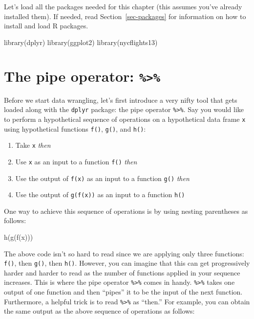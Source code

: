 \documentclass[
  letterpaper,
  DIV=11,
  numbers=noendperiod]{scrreprt}
\newenvironment{Shaded}{\begin{snugshade}}{\end{snugshade}}
\newcommand{\FunctionTok}[1]{\textcolor[rgb]{0.28,0.35,0.67}{#1}}
\newcommand{\NormalTok}[1]{\textcolor[rgb]{0.00,0.23,0.31}{#1}}
\providecommand{\tightlist}{%
  \setlength{\itemsep}{0pt}\setlength{\parskip}{0pt}}\usepackage{longtable,booktabs,array}
\theoremstyle{definition}
\theoremstyle{remark}
\begin{document}
Let's load all the packages needed for this chapter (this assumes you've
already installed them). If needed, read Section~\ref{sec-packages} for
information on how to install and load R packages.

\begin{Shaded}
\begin{Highlighting}[]
\FunctionTok{library}\NormalTok{(dplyr)}
\FunctionTok{library}\NormalTok{(ggplot2)}
\FunctionTok{library}\NormalTok{(nycflights13)}
\end{Highlighting}
\end{Shaded}

\hypertarget{sec-piping}{%
\section{\texorpdfstring{The pipe operator:
\texttt{\%\textgreater{}\%}}{The pipe operator: \%\textgreater\%}}\label{sec-piping}}

Before we start data wrangling, let's first introduce a very nifty tool
that gets loaded along with the \texttt{dplyr} package: the pipe
operator \texttt{\%\textgreater{}\%}. Say you would like to perform a
hypothetical sequence of operations on a hypothetical data frame
\texttt{x} using hypothetical functions \texttt{f()}, \texttt{g()}, and
\texttt{h()}:

\begin{enumerate}
\def\labelenumi{\arabic{enumi}.}
\tightlist
\item
  Take \texttt{x} \emph{then}
\item
  Use \texttt{x} as an input to a function \texttt{f()} \emph{then}
\item
  Use the output of \texttt{f(x)} as an input to a function \texttt{g()}
  \emph{then}
\item
  Use the output of \texttt{g(f(x))} as an input to a function
  \texttt{h()}
\end{enumerate}

One way to achieve this sequence of operations is by using nesting
parentheses as follows:

\begin{Shaded}
\begin{Highlighting}[]
\FunctionTok{h}\NormalTok{(}\FunctionTok{g}\NormalTok{(}\FunctionTok{f}\NormalTok{(x)))}
\end{Highlighting}
\end{Shaded}

The above code isn't so hard to read since we are applying only three
functions: \texttt{f()}, then \texttt{g()}, then \texttt{h()}. However,
you can imagine that this can get progressively harder and harder to
read as the number of functions applied in your sequence increases. This
is where the pipe operator \texttt{\%\textgreater{}\%} comes in handy.
\texttt{\%\textgreater{}\%} takes one output of one function and then
``pipes'' it to be the input of the next function. Furthermore, a
helpful trick is to read \texttt{\%\textgreater{}\%} as ``then.'' For
example, you can obtain the same output as the above sequence of
operations as follows:
\end{document}
